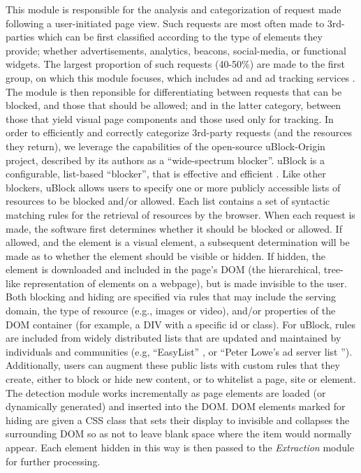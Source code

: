 \documentclass[conference]{IEEEtran}
\begin{document}
This module is responsible for the analysis and categorization of request made following a user-initiated page view. Such requests are most often made to 3rd-parties which can be first classified according to the type of elements they provide; whether advertisements, analytics, beacons, social-media, or functional widgets. The largest proportion of such requests (40-50\%) are made to the first group, on which this module focuses, which includes ad and ad tracking services \cite{Wills}. The module is then reponsible for differentiating between requests that can be blocked, and those that should be allowed; and in the latter category, between those that yield visual page components and those used only for tracking.
In order to efficiently and correctly categorize 3rd-party requests (and the resources they return), we leverage the capabilities of the open-source uBlock-Origin \cite{Gorhill} project, described by its authors as a ``wide-spectrum blocker''. uBlock is a configurable, list-based ``blocker'', that is effective and efficient \cite{Wills}. Like other blockers, uBlock allows users to specify one or more publicly accessible lists of resources to be blocked and/or allowed. Each list contains a set of syntactic matching rules for the retrieval of resources by the browser. When each request is made, the software first determines whether it should be blocked or allowed. If allowed, and the element is a visual element, a subsequent determination will be made as to whether the element should be visible or hidden. If hidden, the element is downloaded and included in the page's DOM (the hierarchical, tree-like representation of elements on a webpage), but is made invisible to the user. Both blocking and hiding are specified via rules that may include the serving domain, the type of resource (e.g., images or video), and/or properties of the DOM container (for example, a DIV with a specific id or class). For uBlock, rules are included from widely distributed lists that are updated and maintained by individuals and communities (e.g, ``EasyList'' \cite{EasyList}, or ``Peter Lowe's ad server list \cite{Lowe}''). Additionally, users can augment these public lists with custom rules that they create, either to block or hide new content, or to whitelist a page, site or element.
The detection module works incrementally as page elements are loaded (or dynamically generated) and inserted into the DOM. DOM elements marked for hiding are given a CSS class that sets their display to invisible and collapses the surrounding DOM so as not to leave blank space where the item would normally appear. Each element hidden in this way is then passed to the \emph{Extraction} module for further processing.
\end{document}
